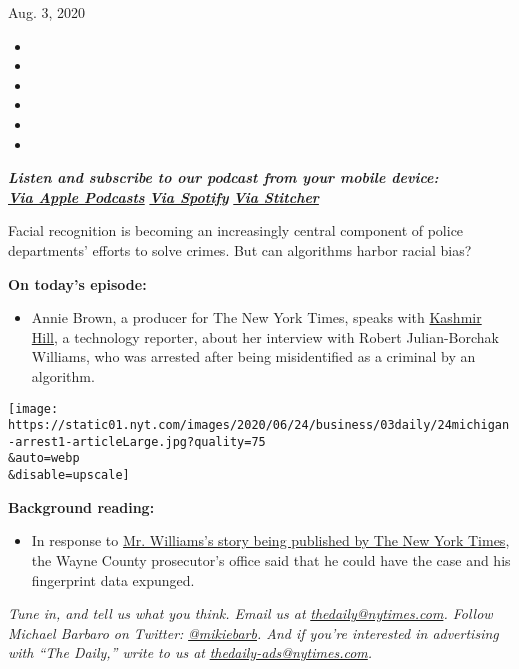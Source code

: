 Aug. 3, 2020

\begin{itemize}
\item
\item
\item
\item
\item
\item
\end{itemize}

\emph{\textbf{Listen and subscribe to our podcast from your mobile
device:}}\\
\textbf{\href{https://itunes.apple.com/us/podcast/the-daily/id1200361736?mt=2}{\emph{Via
Apple Podcasts}}} \emph{\textbf{\textbar{}}}
\textbf{\href{https://open.spotify.com/show/3IM0lmZxpFAY7CwMuv9H4g?si=SfuMSC55R1qprFsRZU3_zw}{\emph{Via
Spotify}}} \emph{\textbf{\textbar{}}}
\textbf{\href{http://www.stitcher.com/podcast/the-new-york-times/the-daily-10}{\emph{Via
Stitcher}}}

Facial recognition is becoming an increasingly central component of
police departments' efforts to solve crimes. But can algorithms harbor
racial bias?

\textbf{On today's episode:}

\begin{itemize}
\tightlist
\item
  Annie Brown, a producer for The New York Times, speaks with
  \href{https://www.nytimes.com/by/kashmir-hill}{Kashmir Hill}, a
  technology reporter, about her interview with Robert Julian-Borchak
  Williams, who was arrested after being misidentified as a criminal by
  an algorithm.
\end{itemize}

\texttt{[image: https://static01.nyt.com/images/2020/06/24/business/03daily/24michigan-arrest1-articleLarge.jpg?quality=75\\\&auto=webp\\\&disable=upscale]}

\textbf{Background reading:}

\begin{itemize}
\tightlist
\item
  In response to
  \href{https://www.nytimes.com/2020/06/24/technology/facial-recognition-arrest.html}{Mr.
  Williams's story being published by The New York Times}, the Wayne
  County prosecutor's office said that he could have the case and his
  fingerprint data expunged.
\end{itemize}

\emph{Tune in, and tell us what you think. Email us at}
\href{mailto:thedaily@nytimes.com}{\emph{thedaily@nytimes.com}}\emph{.
Follow Michael Barbaro on Twitter:}
\href{https://twitter.com/mikiebarb}{\emph{@mikiebarb}}\emph{. And if
you're interested in advertising with ``The Daily,'' write to us at}
\href{mailto:thedaily-ads@nytimes.com}{\emph{thedaily-ads@nytimes.com}}\emph{.}

